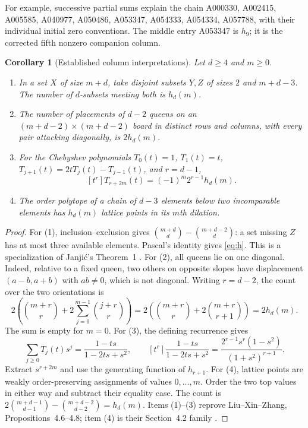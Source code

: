 \documentclass[11pt]{article}
\newtheorem{corollary}[theorem]{Corollary}
\begin{document}
For example, successive partial sums explain the chain A000330, A002415,
A005585, A040977, A050486, A053347, A054333, A054334, A057788, with their
individual initial zero conventions. The middle entry A053347 is $h_9$;
it is the corrected fifth nonzero companion column.

\begin{corollary}[Established column interpretations]\label{cor:interpretations}
Let $d\geq4$ and $m\geq0$.
\begin{enumerate}
\item In a set $X$ of size $m+d$, take disjoint subsets $Y,Z$ of sizes
$2$ and $m+d-3$. The number of $d$-subsets meeting both is $h_d(m)$.
\item The number of placements of $d-2$ queens on an
$(m+d-2)\times(m+d-2)$ board in distinct rows and columns, with every pair
attacking diagonally, is $2h_d(m)$.
\item For the Chebyshev polynomials $T_0(t)=1$, $T_1(t)=t$,
$T_{j+1}(t)=2tT_j(t)-T_{j-1}(t)$, and $r=d-1$,
\[
[t^r]T_{r+2m}(t)=(-1)^m2^{r-1}h_d(m).
\]
\item The order polytope of a chain of $d-3$ elements below two
incomparable elements has $h_d(m)$ lattice points in its $m$th dilation.
\end{enumerate}
\end{corollary}
\begin{proof}
For (1), inclusion--exclusion gives
$\binom{m+d}{d}-\binom{m+d-2}{d}$: a set missing $Z$ has at most three
available elements. Pascal's identity gives \eqref{eq:h}. This is a
specialization of Janji\'c's Theorem~1 \cite{janjic}.
For (2), all queens lie on one diagonal. Indeed, relative to a fixed
queen, two others on opposite slopes have displacement
$(a-b,a+b)$ with $ab\ne0$, which is not diagonal. Writing $r=d-2$, the
count over the two orientations is
\[
2\left(\binom{m+r}{r}+2\sum_{j=0}^{m-1}\binom{j+r}{r}\right)
=2\left(\binom{m+r}{r}+2\binom{m+r}{r+1}\right)=2h_d(m).
\]
The sum is empty for $m=0$.
For (3), the defining recurrence gives
\[
\sum_{j\geq0}T_j(t)s^j=\frac{1-ts}{1-2ts+s^2},\qquad
[t^r]\frac{1-ts}{1-2ts+s^2}
=\frac{2^{r-1}s^r(1-s^2)}{(1+s^2)^{r+1}}.
\]
Extract $s^{r+2m}$ and use the generating function of $h_{r+1}$.
For (4), lattice points are weakly order-preserving assignments of values
$0,\ldots,m$. Order the two top values in either way and subtract their
equality case. The count is
$2\binom{m+d-1}{d-1}-\binom{m+d-2}{d-2}=h_d(m)$.
Items (1)--(3) reprove Liu--Xin--Zhang, Propositions~4.6--4.8;
item (4) is their Section~4.2 family \cite{liu}.
\end{proof}
\end{document}
